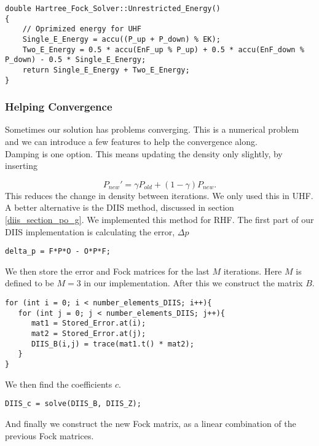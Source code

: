 \documentclass[a4paper,norsk,11pt,twoside]{report}
\begin{document}
\begin{lstlisting}
double Hartree_Fock_Solver::Unrestricted_Energy()
{
    // Oprimized energy for UHF
    Single_E_Energy = accu((P_up + P_down) % EK);
    Two_E_Energy = 0.5 * accu(EnF_up % P_up) + 0.5 * accu(EnF_down % P_down) - 0.5 * Single_E_Energy;
    return Single_E_Energy + Two_E_Energy;
}
\end{lstlisting}


\subsubsection{Helping Convergence}
Sometimes our solution has problems converging. This is a numerical
problem and we can introduce a few features to help the convergence
along. \\

Damping is one option. This means updating the density only slightly, by inserting

\begin{equation}
P_{new}' = \gamma P_{old} + \left( 1 - \gamma \right) P_{new} .
\end{equation}
This reduces the change in density between iterations. We only used this in UHF. \\

A better alternative is the DIIS method, discussed in section
\ref{diis_section_po_g}. We implemented this method for RHF. The first
part of our DIIS implementation is calculating the error, $\Delta p$
\begin{lstlisting}
delta_p = F*P*O - O*P*F;
\end{lstlisting}

We then store the error and Fock matrices for the last $M$ iterations. Here $M$ is defined to be $M = 3$ in our implementation. After this we construct the matrix $B$. 

\begin{lstlisting}
for (int i = 0; i < number_elements_DIIS; i++){
   for (int j = 0; j < number_elements_DIIS; j++){
      mat1 = Stored_Error.at(i);
      mat2 = Stored_Error.at(j);
      DIIS_B(i,j) = trace(mat1.t() * mat2);
   }
}
\end{lstlisting}

We then find the coefficients $c$.
\begin{lstlisting}
DIIS_c = solve(DIIS_B, DIIS_Z);
\end{lstlisting}

And finally we construct the new Fock matrix, as a linear combination of the previous Fock matrices. 
\end{document}
